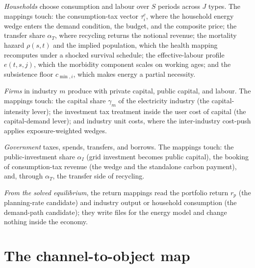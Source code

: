 \emph{Households} choose consumption and labour over $S$ periods across $J$ types.
The mappings touch: the consumption-tax vector $\tau^{c}_{i}$, where the household
energy wedge enters the demand condition, the budget, and the composite price; the
transfer share $\alpha_T$, where recycling returns the notional revenue; the
mortality hazard $\rho(s,t)$ and the implied population, which the health mapping
recomputes under a shocked survival schedule; the effective-labour profile
$e(t,s,j)$, which the morbidity component scales on working ages; and the
subsistence floor $c_{\min,i}$, which makes energy a partial necessity.

\emph{Firms} in industry $m$ produce with private capital, public capital, and
labour. The mappings touch: the capital share $\gamma_m$ of the electricity industry
(the capital-intensity lever); the investment tax treatment inside the user cost of
capital (the capital-demand lever); and industry unit costs, where the
inter-industry cost-push applies exposure-weighted wedges.

\emph{Government} taxes, spends, transfers, and borrows. The mappings touch: the
public-investment share $\alpha_I$ (grid investment becomes public capital), the
booking of consumption-tax revenue (the wedge and the standalone carbon payment),
and, through $\alpha_T$, the transfer side of recycling.

\emph{From the solved equilibrium}, the return mappings read the portfolio return
$r_p$ (the planning-rate candidate) and industry output or household consumption
(the demand-path candidate); they write files for the energy model and change
nothing inside the economy.

\section{The channel-to-object map}
\label{app:channel-map}

